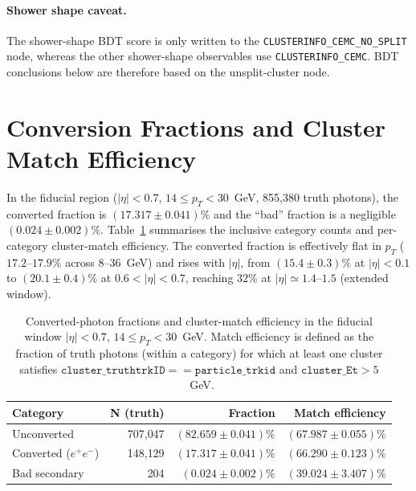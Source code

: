 \documentclass[11pt,a4paper]{article}
\newcommand{\epem}{\ensuremath{e^{+}e^{-}}}
\begin{document}
\paragraph{Shower shape caveat.} The shower-shape BDT score is only written to
the \texttt{CLUSTERINFO\_CEMC\_NO\_SPLIT} node, whereas the other shower-shape
observables use \texttt{CLUSTERINFO\_CEMC}. BDT conclusions below are therefore
based on the unsplit-cluster node.


\section{Conversion Fractions and Cluster Match Efficiency}
\label{sec:fractions}

In the fiducial region ($|\eta|<0.7$, $14 \le p_T < 30$~GeV, 855{,}380 truth
photons), the converted fraction is $(17.317 \pm 0.041)\%$ and the ``bad''
fraction is a negligible $(0.024 \pm 0.002)\%$.
Table~\ref{tab:fractions_inclusive} summarises the inclusive category counts
and per-category cluster-match efficiency. The converted fraction is
effectively flat in \(p_T\) ($17.2$--$17.9\%$ across 8--36~GeV) and rises with
$|\eta|$, from $(15.4 \pm 0.3)\%$ at $|\eta|<0.1$ to $(20.1 \pm 0.4)\%$ at
$0.6 < |\eta| < 0.7$, reaching $32\%$ at $|\eta| \simeq 1.4$--$1.5$
(extended window).

\begin{table}[H]
\centering
\caption{Converted-photon fractions and cluster-match efficiency in the
fiducial window $|\eta|<0.7$, $14 \le p_T < 30$~GeV.  Match efficiency is
defined as the fraction of truth photons (within a category) for which at
least one cluster satisfies $\texttt{cluster\_truthtrkID}==\texttt{particle\_trkid}$
and $\texttt{cluster\_Et}>5$~GeV.
}
\label{tab:fractions_inclusive}
\begin{tabular}{lrrr}
\toprule
Category & N (truth) & Fraction & Match efficiency \\
\midrule
Unconverted         & 707{,}047 & $(82.659 \pm 0.041)\%$ & $(67.987 \pm 0.055)\%$ \\
Converted (\epem)   & 148{,}129 & $(17.317 \pm 0.041)\%$ & $(66.290 \pm 0.123)\%$ \\
Bad secondary       &       204 & $(0.024  \pm 0.002)\%$ & $(39.024 \pm 3.407)\%$ \\
\bottomrule
\end{tabular}
\end{table}
\end{document}

